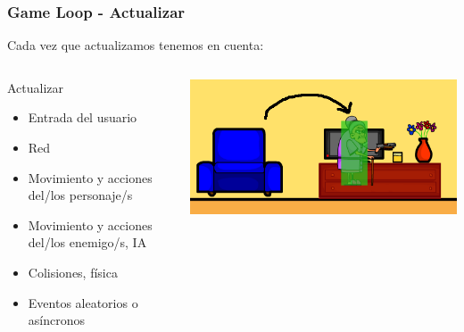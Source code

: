 \documentclass{beamer}
\begin{document}
\begin{frame}
	\frametitle{Game Loop - Actualizar}
	
	Cada vez que actualizamos tenemos en cuenta:
	
	\begin{columns}[c]
	\column{175pt}
		
	\begin{block}{Actualizar}
		\begin{itemize}
			\item Entrada del usuario
			\item Red
			\item Movimiento y acciones del/los personaje/s
			\item Movimiento y acciones del/los enemigo/s, IA
			\item Colisiones, física
			\item Eventos aleatorios o asíncronos
		\end{itemize}            
	\end{block}
	
	\column{125pt}
	
	\begin{center}
		\includegraphics[scale=0.25]{img/grannycolision.png}
	\end{center}	
	
	\end{columns}
	
\end{frame}
\end{document}
